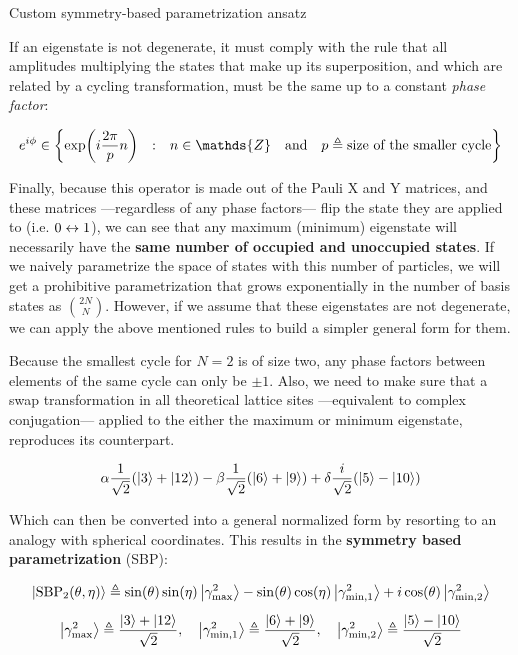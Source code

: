 \documentclass[9pt, handout, aspectratio=169]{beamer}	%
\begin{document}
\begin{frame}[allowframebreaks]{Custom symmetry-based parametrization ansatz}
\break

	If an eigenstate is not degenerate, it must comply with the rule that all amplitudes multiplying the states that make up its superposition, and which are related by a cycling transformation, must be the same up to a constant \emph{phase factor}:

	\begin{gather*}
	  e^{i\phi} \in
	    \qty{ \exp(i \frac{2\pi}{p} n) \qq{:} n \in \mathds{Z} \qq{and}
	    p \defeq \text{size of the smaller cycle} }
	\end{gather*}

	Finally, because this operator is made out of the Pauli X and Y matrices, and these matrices ---regardless of any phase factors--- flip the state they are applied to (i.e. $0 \leftrightarrow 1$), we can see that any maximum (minimum) eigenstate will necessarily have the \textbf{same number of occupied and unoccupied states}. If we naively parametrize the space of states with this number of particles, we will get a prohibitive parametrization that grows exponentially in the number of basis states as $\binom{2N}{N}$. However, if we assume that these eigenstates are not degenerate, we can apply the above mentioned rules to build a simpler general form for them.

\break

	Because the smallest cycle for $N=2$ is of size two, any phase factors between elements of the same cycle can only be $\pm 1$. Also, we need to make sure that a swap transformation in all theoretical lattice sites ---equivalent to complex conjugation--- applied to the either the maximum or minimum eigenstate, reproduces its counterpart.

	\begin{gather*}
	  \alpha \frac{1}{\sqrt{2}} \qty(\ket{3}+\ket{12}) -
	  \beta \frac{1}{\sqrt{2}} \qty(\ket{6}+\ket{9})  +
	  \delta \frac{i}{\sqrt{2}} \qty(\ket{5} - \ket{10})
	\end{gather*}

	Which can then be converted into a general normalized form by resorting to an analogy with spherical coordinates. This results in the \textbf{symmetry based parametrization} (SBP):

	\begin{gather*}
	  \ket{\text{SBP}_{2} \qty(\theta, \eta)} \defeq
	    \sin(\theta)\sin(\eta) \ket{\gamma_{\text{max}}^2} -
	    \sin(\theta)\cos(\eta) \ket{\gamma_{\text{min},1}^2} + i
	    \cos(\theta) \ket{\gamma_{\text{min},2}^2} \\[5pt]
	  \ket{\gamma_{\text{max}}^2} \defeq
	    \frac{\ket{3}+\ket{12}}{\sqrt{2}} \qc
	  \ket{\gamma_{\text{min},1}^2} \defeq
	    \frac{\ket{6}+\ket{9}}{\sqrt{2}} \qc
	  \ket{\gamma_{\text{min},2}^2} \defeq
	    \frac{\ket{5} - \ket{10}}{\sqrt{2}}
	\end{gather*}


\end{frame}
\end{document}
